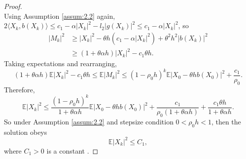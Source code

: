 \documentclass[10pt,a4paper]{amsart}
\begin{document}
\begin{proof}
\[\]  
Using Assumption \ref{assum:2.2} again, $ 2\langle X_k, b(X_k) \rangle \leq c_1 - \alpha |X_k|^2 - l_2 |g(X_k)|^2 \leq c_1 - \alpha |X_k|^2 $, so  
\[
\begin{aligned}
	|M_k|^2 &\geq |X_k|^2 - \theta h (c_1 - \alpha |X_k|^2) + \theta^2 h^2 |b(X_k)|^2 \\
	&\geq (1 + \theta \alpha h)|X_k|^2 - c_1 \theta h.
\end{aligned}
\]  
Taking expectations and rearranging,  
\[
(1 + \theta \alpha h) \mathbb{E}|X_k|^2 - c_1 \theta h \leq \mathbb{E}|M_k|^2 \leq (1 - \rho_0 h)^k \mathbb{E}|X_0 - \theta h b(X_0)|^2 + \frac{c_1}{\rho_0}.
\]  
Therefore,  
\[
\mathbb{E}|X_k|^2 \leq \frac{(1 - \rho_0 h)^k}{1 + \theta \alpha h} \mathbb{E}|X_0 - \theta h b(X_0)|^2 + \frac{c_1}{\rho_0 (1 + \theta \alpha h)} + \frac{c_1 \theta h}{1 + \theta \alpha h}.
\]  
So under Assumption \ref{assum:2.2} and stepsize condition $ 0 < \rho_0 h < 1 $, then the solution obeys
\[
\mathbb{E}|X_k|^2 \leq C_1,
\]
where $C_1 > 0$ is a constant .
\end{proof}
\end{document}
